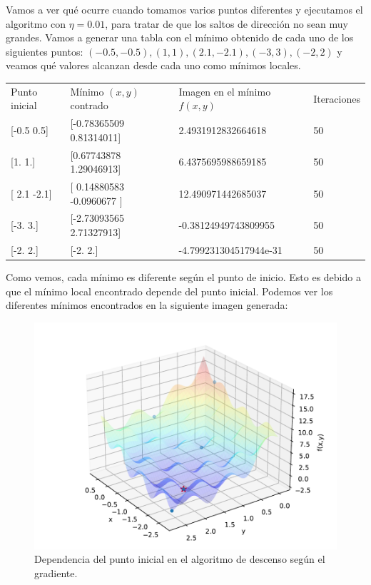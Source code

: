 \documentclass[12pt]{scrartcl}
\begin{document}
{Vamos a ver qué ocurre cuando tomamos varios puntos diferentes y ejecutamos el algoritmo con $\eta = 0.01$, para tratar de que los saltos de dirección no sean muy grandes. Vamos a generar una tabla con el mínimo obtenido de cada uno de los siguientes puntos:
$(-0.5,-0.5),(1,1),(2.1,-2.1),(-3,3),(-2,2)$ y veamos qué valores alcanzan desde cada uno como mínimos locales.

\begin{table}[H]
  \begin{tabular}{llll}
  Punto inicial   & Mínimo $(x,y)$ contrado       & Imagen en el mínimo $f(x,y)$ & Iteraciones \\
  {[}-0.5  0.5{]} & {[}-0.78365509  0.81314011{]} & 2.4931912832664618           & 50          \\
  {[}1. 1.{]}     & {[}0.67743878 1.29046913{]}   & 6.4375695988659185           & 50          \\
  {[} 2.1 -2.1{]} & {[} 0.14880583 -0.0960677 {]} & 12.490971442685037           & 50          \\
  {[}-3.  3.{]}   & {[}-2.73093565  2.71327913{]} & -0.38124949743809955         & 50          \\
  {[}-2.  2.{]}   & {[}-2.  2.{]}                 & -4.799231304517944e-31       & 50         
  \end{tabular}
\end{table}


Como vemos, cada mínimo es diferente según el punto de inicio. Esto es debido a que el mínimo local encontrado depende del punto inicial. Podemos ver los diferentes mínimos encontrados en la siguiente imagen generada:

\begin{figure}[H]
  \centering
  \includegraphics[scale=0.6]{media/E1-2-minimums-moved.pdf}
  \caption{Dependencia del punto inicial en el algoritmo de descenso según el gradiente.}
\end{figure}


}
\end{document}
